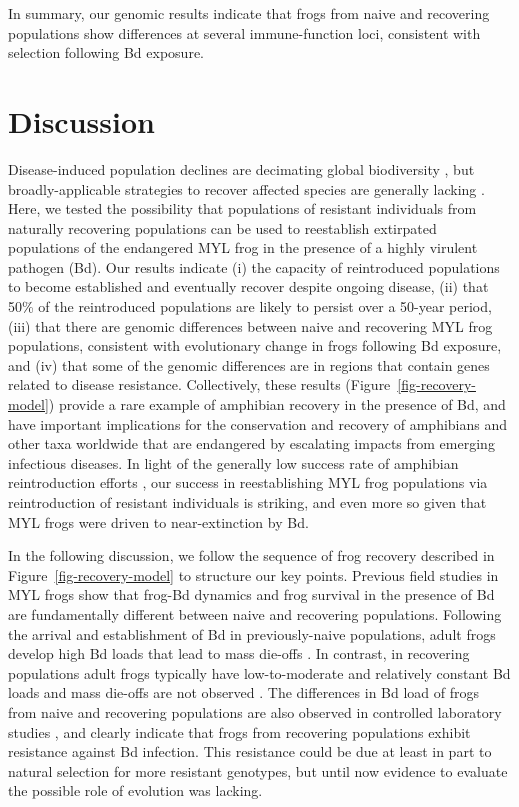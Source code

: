 \documentclass[9pt,twocolumn,twoside,lineno]{pnas-new}
\begin{document}
In summary, our genomic results indicate that frogs from naive and
recovering populations show differences at several immune-function loci,
consistent with selection following Bd exposure.

\section*{Discussion}

Disease-induced population declines are decimating global biodiversity
\citep{daszak2000}, but broadly-applicable strategies to recover
affected species are generally lacking \citep[e.g.,][]{garner2016}.
Here, we tested the possibility that populations of resistant
individuals from naturally recovering populations can be used to
reestablish extirpated populations of the endangered MYL frog in the
presence of a highly virulent pathogen (Bd). Our results indicate (i)
the capacity of reintroduced populations to become established and
eventually recover despite ongoing disease, (ii) that 50\% of the
reintroduced populations are likely to persist over a 50-year period,
(iii) that there are genomic differences between naive and recovering
MYL frog populations, consistent with evolutionary change in frogs
following Bd exposure, and (iv) that some of the genomic differences are
in regions that contain genes related to disease resistance.
Collectively, these results (Figure~\ref{fig-recovery-model}) provide a
rare example of amphibian recovery in the presence of Bd, and have
important implications for the conservation and recovery of amphibians
and other taxa worldwide that are endangered by escalating impacts from
emerging infectious diseases. In light of the generally low success rate
of amphibian reintroduction efforts \citep{dodd2005}, our success in
reestablishing MYL frog populations via reintroduction of resistant
individuals is striking, and even more so given that MYL frogs were
driven to near-extinction by Bd.

In the following discussion, we follow the sequence of frog recovery
described in Figure~\ref{fig-recovery-model} to structure our key
points. Previous field studies in MYL frogs show that frog-Bd dynamics
and frog survival in the presence of Bd are fundamentally different
between naive and recovering populations. Following the arrival and
establishment of Bd in previously-naive populations, adult frogs develop
high Bd loads that lead to mass die-offs \citep{vredenburg2010}. In
contrast, in recovering populations adult frogs typically have
low-to-moderate and relatively constant Bd loads and mass die-offs are
not observed \citep[see also Figure S2]{briggs2010, knapp2011}. The differences in Bd load of frogs from
naive and recovering populations are also observed in controlled
laboratory studies \citep[see Figure 4 in][]{knapp2016}, and clearly
indicate that frogs from recovering populations exhibit resistance
against Bd infection. This resistance could be due at least in part to
natural selection for more resistant genotypes, but until now evidence
to evaluate the possible role of evolution was lacking.
\end{document}
